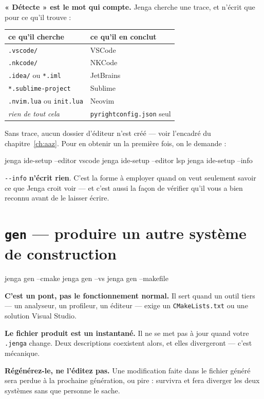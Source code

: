 \textbf{« Détecte » est le mot qui compte.} Jenga cherche une trace, et n'écrit
que pour ce qu'il trouve :

\begin{center}
\small
\begin{tabular}{@{}ll@{}}
\toprule
\textbf{ce qu'il cherche} & \textbf{ce qu'il en conclut} \\
\midrule
\texttt{.vscode/} & VSCode \\
\texttt{.nkcode/} & NKCode \\
\texttt{.idea/} ou \texttt{*.iml} & JetBrains \\
\texttt{*.sublime-project} & Sublime \\
\texttt{.nvim.lua} ou \texttt{init.lua} & Neovim \\
\midrule
\emph{rien de tout cela} & \texttt{pyrightconfig.json} seul \\
\bottomrule
\end{tabular}
\end{center}

Sans trace, aucun dossier d'éditeur n'est créé --- voir l'encadré du
chapitre~\ref{ch:aaz}. Pour en obtenir un la première fois, on le demande :

\begin{nkcode}{}
jenga ide-setup --editor vscode
jenga ide-setup --editor lsp
jenga ide-setup --info
\end{nkcode}

\begin{nkretenir}
\texttt{-{}-info} \textbf{n'écrit rien}. C'est la forme à employer quand on
veut seulement savoir ce que Jenga croit voir --- et c'est aussi la façon de
vérifier qu'il vous a bien reconnu avant de le laisser écrire.
\end{nkretenir}

\section{\texttt{gen} --- produire un autre système de construction}

\begin{nkcode}{}
jenga gen --cmake
jenga gen --vs
jenga gen --makefile
\end{nkcode}

\begin{nkretenir}
\textbf{C'est un pont, pas le fonctionnement normal.} Il sert quand un outil tiers
--- un analyseur, un profileur, un éditeur --- exige un \texttt{CMakeLists.txt} ou
une solution Visual Studio.

\alerte{} \textbf{Le fichier produit est un instantané.} Il ne se met pas à jour quand
votre \texttt{.jenga} change. Deux descriptions coexistent alors, et elles
divergeront --- c'est mécanique.

\textbf{Régénérez-le, ne l'éditez pas.} Une modification faite dans le fichier
généré sera perdue à la prochaine génération, ou pire : survivra et fera diverger
les deux systèmes sans que personne le sache.
\end{nkretenir}

